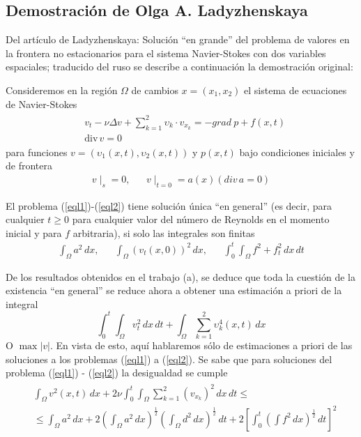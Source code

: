 \subsection{Demostración de Olga A. Ladyzhenskaya}
Del artículo de Ladyzhenskaya: Solución ``en grande'' del problema de valores en la frontera no estacionarios para el sistema Navier-Stokes con dos variables espaciales; traducido del ruso se describe a continuación la demostración original:

Consideremos en la región $\Omega$ de cambios $x = (x_1, x_2)$ el sistema de ecuaciones de Navier-Stokes
\begin{align}
    \begin{split}
    &v_t -\nu \Delta v + \sum_{k = 1}^{2} \upsilon_k \cdot v_{x_k} = - grad\: p + f(x,t)\\
    &\text{div}\, v = 0
    \label{eql1}
    \end{split}
\end{align}
para funciones $v = \left(\upsilon_1(x, t), \upsilon_2(x, t)  \right)$ y $p(x, t)$ bajo condiciones iniciales y de frontera
\begin{align}
    v\mid_s = 0,&&v\mid_{t = 0} = a(x)\left(div\, a = 0 \right)
    \label{eql2}
\end{align}
\begin{theorem}
    El problema (\ref{eql1})-(\ref{eql2}) tiene solución única ``en general'' (es decir, para cualquier $t\geq 0$ para cualquier valor del número de Reynolds en el momento inicial y para $f$ arbitraria), si solo las integrales son finitas
    \begin{align*}
        \int_{\Omega} a^2\,dx,&&\int_{\Omega}\left(v_t(x,0)\right)^2\,dx, &&\int_0^t\int_{\Omega} f^2 + f_t^2\,dx\,dt
    \end{align*}
\end{theorem}
De los resultados obtenidos en el trabajo (a), se deduce que toda la cuestión de la existencia ``en general'' se reduce ahora a obtener una estimación a priori de la integral
\begin{equation}
    \int_0^t\int_{\Omega} v_t^2\,dx\,dt + \int_{\Omega} \sum_{k = 1}^2 \upsilon_k^4(x,t)\,dx
    \label{eql3}
\end{equation}
O $\max \left\lvert v \right\rvert $. En vista de esto, aquí hablaremos sólo de estimaciones a priori de las soluciones a los problemas (\ref{eql1}) a (\ref{eql2}). Se sabe que para soluciones del problema (\ref{eql1}) - (\ref{eql2}) la desigualdad se cumple
\begin{align}
    \begin{split}
        &\int_{\Omega}v^2(x,t)\,dx + 2\nu \int_0^t\int_{\Omega}\sum_{k =1}^2 \left(v_{x_k}\right)^2\,dx\,dt\leq\\
        &\leq \int_{\Omega}a^2\,dx + 2\left(\int_{\Omega}a^2\,dx\right)^{\frac{1}{2}}\left(\int_{\Omega} d^2\,dx\right)^{\frac{1}{2}}\,dt + 2\left[\int_0^t\left(\int f^2\,dx\right)^{\frac{1}{2}}\,dt\right]^2
        \label{eql4}
    \end{split}
\end{align}
